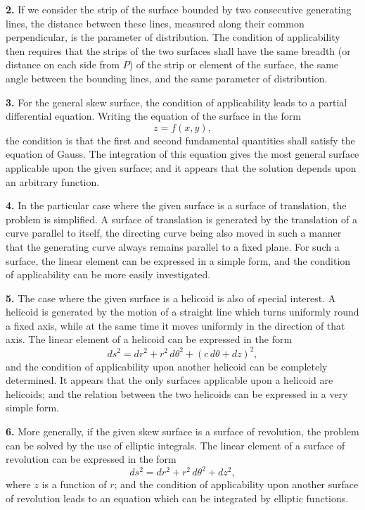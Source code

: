 \documentclass[11pt,a4paper]{book}
\begin{document}
{{{\textbf{2.} If we consider the strip of the surface bounded by two consecutive
generating lines, the distance between these lines, measured along their common
perpendicular, is the parameter of distribution. The condition of applicability
then requires that the strips of the two surfaces shall have the same breadth (or
distance on each side from $P$) of the strip or element of the surface, the same
angle between the bounding lines, and the same parameter of distribution.

\textbf{3.} For the general skew surface, the condition of applicability leads to a
partial differential equation. Writing the equation of the surface in the form
\[
z = f(x, y),
\]
the condition is that the first and second fundamental quantities shall satisfy the
equation of Gauss. The integration of this equation gives the most general
surface applicable upon the given surface; and it appears that the solution depends
upon an arbitrary function.

\textbf{4.} In the particular case where the given surface is a surface of translation,
the problem is simplified. A surface of translation is generated by the translation
of a curve parallel to itself, the directing curve being also moved in such a manner
that the generating curve always remains parallel to a fixed plane. For such a
surface, the linear element can be expressed in a simple form, and the condition of
applicability can be more easily investigated.

\textbf{5.} The case where the given surface is a helicoid is also of special interest.
A helicoid is generated by the motion of a straight line which turns uniformly
round a fixed axis, while at the same time it moves uniformly in the direction of
that axis. The linear element of a helicoid can be expressed in the form
\[
ds^2 = dr^2 + r^2\,d\theta^2 + (c\,d\theta + dz)^2,
\]
and the condition of applicability upon another helicoid can be completely
determined. It appears that the only surfaces applicable upon a helicoid are
helicoids; and the relation between the two helicoids can be expressed in a very
simple form.

\textbf{6.} More generally, if the given skew surface is a surface of revolution,
the problem can be solved by the use of elliptic integrals. The linear element of
a surface of revolution can be expressed in the form
\[
ds^2 = dr^2 + r^2\,d\theta^2 + dz^2,
\]
where $z$ is a function of $r$; and the condition of applicability upon another surface
of revolution leads to an equation which can be integrated by elliptic functions.

}}}
\end{document}
